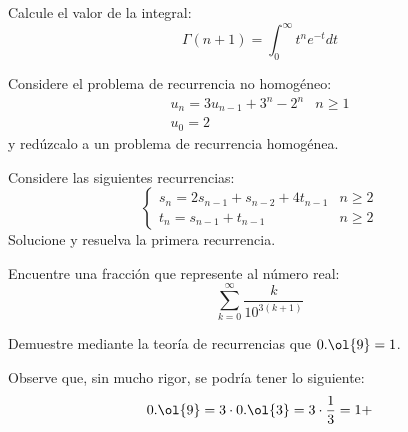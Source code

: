 \begin{ejercicio}
    Calcule el valor de la integral:
    \begin{equation*}
        \Gamma(n+1) = \int_0^{\infty} t^{n} e^{-t} dt
    \end{equation*}
\end{ejercicio}


\begin{ejercicio}
    Considere el problema de recurrencia no homogéneo:
    \begin{equation*}
        \begin{array}{ll}
            u_n = 3u_{n-1} +3^n-2^n & n\geq 1 \\
            u_0 = 2
        \end{array}
    \end{equation*}
    y redúzcalo a un problema de recurrencia homogénea.
\end{ejercicio}


\begin{ejercicio}
    Considere las siguientes recurrencias:
    \begin{equation*}
        \left\{
            \begin{array}{ll}
                s_n  = 2s_{n-1} + s_{n-2} + 4t_{n-1} & n\geq 2 \\
                t_n = s_{n-1} + t_{n-1} & n\geq 2
            \end{array}
        \right.
    \end{equation*}
    Solucione y resuelva la primera recurrencia.
\end{ejercicio}



\begin{ejercicio}
    Encuentre una fracción que represente al número real:
    \begin{equation*}
        \sum_{k=0}^{\infty} \dfrac{k}{10^{3(k+1)}}
    \end{equation*}
\end{ejercicio}



\begin{ejercicio}
    Demuestre mediante la teoría de recurrencias que $0.\ol{9}=1$.
    \begin{observacion}
        Observe que, sin mucho rigor, se podría tener lo siguiente:
        \begin{equation*}
            0.\ol{9} = 3\cdot 0.\ol{3} = 3\cdot \dfrac{1}{3} = 1+
        \end{equation*}
    \end{observacion}
\end{ejercicio}